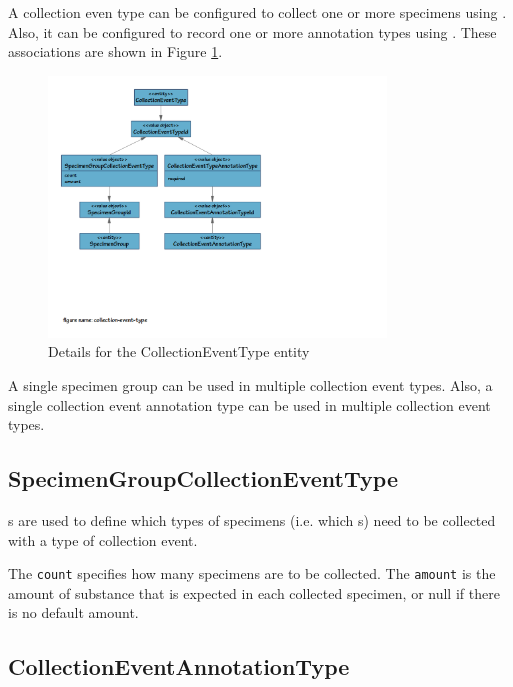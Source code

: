 A collection even type can be configured to collect one or more specimens using
. Also, it can be configured to
record one or more annotation types using
. These associations are shown in
Figure \ref{fig:collection-event-type}.

\begin{figure}[H]
  \centering
  \includegraphics[trim={9mm 70mm 96mm 9mm}, clip,
    width=0.8\textwidth]{images/collection-event-type}
  \caption{Details for the CollectionEventType entity}
  \label{fig:collection-event-type}
\end{figure}

A single specimen group can be used in multiple collection event
types. Also, a single collection event annotation type can be used in multiple
collection event types.

\subsection*{SpecimenGroupCollectionEventType}

s are used to
define which types of specimens (i.e. which s) need
to be collected with a type of collection event.

The \texttt{count} specifies how many specimens are to be collected. The
\texttt{amount} is the amount of substance that is expected in each collected
specimen, or null if there is no default amount.

\subsection*{CollectionEventAnnotationType}


